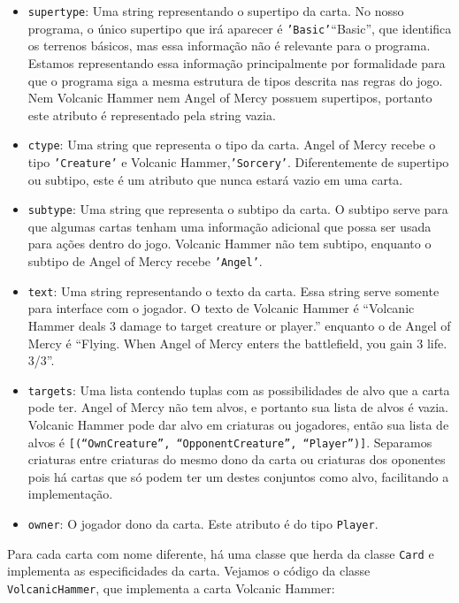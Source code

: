 \begin{itemize}
  \item\texttt{supertype}: Uma string representando o supertipo da carta. No nosso programa,
  o único supertipo que irá aparecer é \texttt{'Basic'}``Basic'', que identifica os terrenos básicos, mas essa
  informação não é relevante para o programa. Estamos representando essa informação principalmente por formalidade para que o programa siga a mesma estrutura de tipos descrita nas regras do jogo. Nem Volcanic Hammer nem Angel of Mercy
  possuem supertipos, portanto este atributo é representado pela string vazia.
  \item\texttt{ctype}: Uma string que representa o tipo da carta. Angel of Mercy recebe o tipo
  \texttt{'Creature'} e Volcanic Hammer,\texttt{'Sorcery'}. Diferentemente de supertipo ou subtipo,
  este é um atributo que nunca estará vazio em uma carta.
  \item\texttt{subtype}: Uma string que representa o subtipo da carta. O subtipo serve para que
  algumas cartas tenham uma informação adicional que possa ser usada para ações dentro do jogo.
  Volcanic Hammer não tem subtipo, enquanto o subtipo de Angel of Mercy recebe \texttt{'Angel'}.
  \item\texttt{text}: Uma string representando o texto da carta. Essa string serve somente para
  interface com o jogador. O texto de Volcanic Hammer é ``Volcanic Hammer deals 3 damage to target
  creature or player.'' enquanto o de Angel of Mercy é ``Flying. When Angel of Mercy enters the
  battlefield, you gain 3 life. 3/3''.
  \item\texttt{targets}: Uma lista contendo tuplas com as possibilidades de alvo que a carta
  pode ter. Angel of Mercy não tem alvos, e portanto sua lista de alvos é vazia. Volcanic Hammer
  pode dar alvo em criaturas ou jogadores, então sua lista de alvos é
  \texttt{[(``OwnCreature'', ``OpponentCreature'', ``Player'')]}. Separamos criaturas  entre
  criaturas do mesmo dono da carta ou criaturas dos oponentes pois há cartas que só podem ter
  um destes conjuntos como alvo, facilitando a implementação.
  \item\texttt{owner}: O jogador dono da carta. Este atributo é do tipo \texttt{Player}.
\end{itemize}
Para cada carta com nome diferente, há uma classe que herda da classe \texttt{Card} e implementa
as especificidades da carta. Vejamos o código da classe \texttt{VolcanicHammer}, que implementa
a carta Volcanic Hammer:
\begin{figure}
  
\end{figure}

